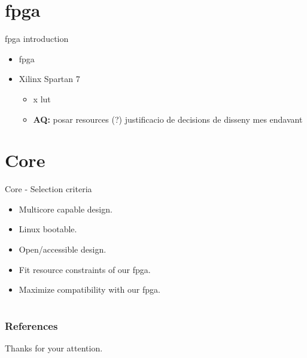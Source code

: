 \documentclass[xcolor=table]{beamer}
\newcommand{\aqnote}[1]{ {\color{violet}\textbf{AQ:} #1 } }
\begin{document}
\section{\acrshort{fpga}}
\begin{frame}{\acrshort{fpga} introduction}
    \begin{itemize}
        \item \acrfull{fpga}
        \item Xilinx Spartan 7 \cite{sp701} \cite{fpga_resources}
            \begin{itemize}
                \item x \gls{lut}
                \item \aqnote{posar resources (?) justificacio de decisions de disseny mes endavant}
            \end{itemize}
    \end{itemize}
\end{frame}

\section{Core}
\begin{frame}{Core - Selection criteria}
  \begin{itemize}
    \item Multicore capable design.
    \item Linux bootable.
    \item Open/accessible design.
    \item Fit resource constraints of our fpga. 
    \item Maximize compatibility with our fpga.
  \end{itemize}
\end{frame}

\section*{}

\begin{frame}[allowframebreaks]
        \frametitle{References}


\end{frame}


\begin{frame}{}
    \centering
    \Large Thanks for your attention.
\end{frame}
\end{document}
